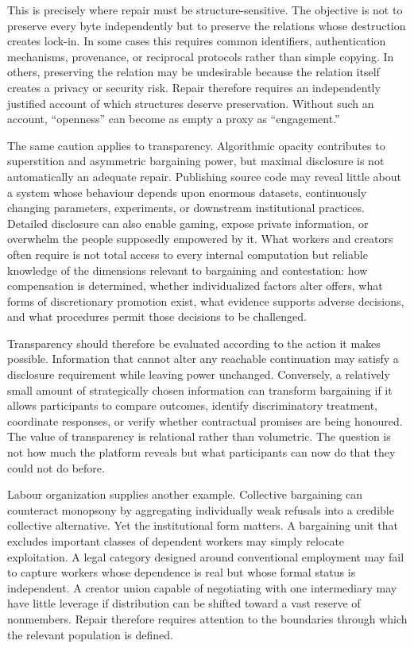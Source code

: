 \documentclass[11pt]{article}
\begin{document}
This is precisely where repair must be structure-sensitive. The objective is not to preserve every byte independently but to preserve the relations whose destruction creates lock-in. In some cases this requires common identifiers, authentication mechanisms, provenance, or reciprocal protocols rather than simple copying. In others, preserving the relation may be undesirable because the relation itself creates a privacy or security risk. Repair therefore requires an independently justified account of which structures deserve preservation. Without such an account, ``openness'' can become as empty a proxy as ``engagement.''

The same caution applies to transparency. Algorithmic opacity contributes to superstition and asymmetric bargaining power, but maximal disclosure is not automatically an adequate repair. Publishing source code may reveal little about a system whose behaviour depends upon enormous datasets, continuously changing parameters, experiments, or downstream institutional practices. Detailed disclosure can also enable gaming, expose private information, or overwhelm the people supposedly empowered by it. What workers and creators often require is not total access to every internal computation but reliable knowledge of the dimensions relevant to bargaining and contestation: how compensation is determined, whether individualized factors alter offers, what forms of discretionary promotion exist, what evidence supports adverse decisions, and what procedures permit those decisions to be challenged.

Transparency should therefore be evaluated according to the action it makes possible. Information that cannot alter any reachable continuation may satisfy a disclosure requirement while leaving power unchanged. Conversely, a relatively small amount of strategically chosen information can transform bargaining if it allows participants to compare outcomes, identify discriminatory treatment, coordinate responses, or verify whether contractual promises are being honoured. The value of transparency is relational rather than volumetric. The question is not how much the platform reveals but what participants can now do that they could not do before.

Labour organization supplies another example. Collective bargaining can counteract monopsony by aggregating individually weak refusals into a credible collective alternative. Yet the institutional form matters. A bargaining unit that excludes important classes of dependent workers may simply relocate exploitation. A legal category designed around conventional employment may fail to capture workers whose dependence is real but whose formal status is independent. A creator union capable of negotiating with one intermediary may have little leverage if distribution can be shifted toward a vast reserve of nonmembers. Repair therefore requires attention to the boundaries through which the relevant population is defined.
\end{document}
